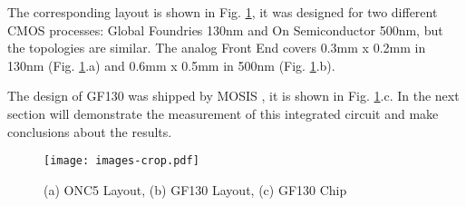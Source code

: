 The corresponding layout is shown in Fig. \ref{fig:layout}, it was designed for two different CMOS processes: Global Foundries 130nm and On Semiconductor 500nm, but the topologies are similar. The analog Front End covers 0.3mm x 0.2mm in 130nm (Fig. \ref{fig:layout}.a) and 0.6mm x 0.5mm in 500nm (Fig. \ref{fig:layout}.b).

The design of GF130 was shipped by MOSIS \cite{mosis}, it is shown in Fig. \ref{fig:layout}.c. In the next section will demonstrate the measurement of this integrated circuit and make conclusions about the results.

\begin{figure}[h]
  \centering
  \texttt{[image: images-crop.pdf]}
  \caption{(a) ONC5 Layout, (b) GF130 Layout, (c) GF130 Chip}
  \label{fig:layout}
\end{figure}